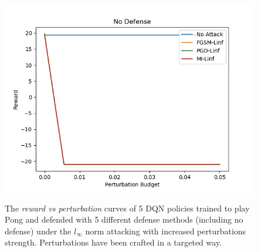 \begin{figure}
    {\includegraphics[width=0.49\linewidth]{images/exp3/targeted/No_Defense.jpg}}
  \caption{The {\it reward vs perturbation} curves of 5 DQN policies trained to play Pong and defended with 5 different defense methods (including no defense) under the \(l_\infty\) norm attacking with increased perturbations strength. Perturbations have been crafted in a targeted way.}
  \label{figure:targeted-rew}
\end{figure}

